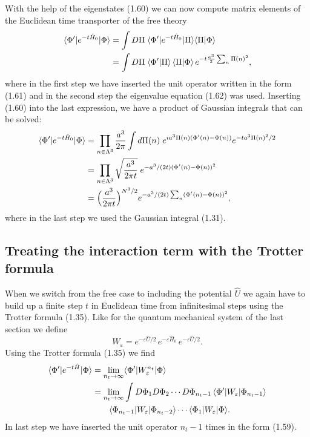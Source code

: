 With the help of the eigenstates (1.60) we can now compute matrix elements of
the Euclidean time transporter of the free theory
\begin{align}
  \langle\Phi'|e^{-t\hat{H}_0}|\Phi\rangle
  &= \int D\Pi\;\langle\Phi'|e^{-t\hat{H}_0}|\Pi\rangle\langle\Pi|\Phi\rangle \notag\\
  &= \int D\Pi\;\langle\Phi'|\Pi\rangle\,\langle\Pi|\Phi\rangle\,
     e^{-t\frac{a^3}{2}\sum_n \Pi(n)^2},
\end{align}
where in the first step we have inserted the unit operator written in the form
(1.61) and in the second step the eigenvalue equation (1.62) was used.
Inserting (1.60) into the last expression, we have a product of Gaussian
integrals that can be solved:
\begin{align}
  \langle\Phi'|e^{-t\hat{H}_0}|\Phi\rangle
  &= \prod_{n\in\Lambda^3}\frac{a^3}{2\pi}
     \int d\Pi(n)\;e^{i a^3\Pi(n)(\Phi'(n)-\Phi(n))}
     e^{-t a^3\Pi(n)^2/2} \notag\\
  &= \prod_{n\in\Lambda^3}\sqrt{\frac{a^3}{2\pi t}}\;
     e^{-a^3/(2t)(\Phi'(n)-\Phi(n))^2} \notag\\
  &= \Big(\frac{a^3}{2\pi t}\Big)^{N^3/2}
     e^{-a^3/(2t)\sum_n(\Phi'(n)-\Phi(n))^2},
\end{align}
where in the last step we used the Gaussian integral (1.31).

\subsection{Treating the interaction term with the Trotter formula}

When we switch from the free case to including the potential $\hat{U}$ we again
have to build up a finite step $t$ in Euclidean time from infinitesimal steps
using the Trotter formula (1.35). Like for the quantum mechanical system of the
last section we define
\begin{equation}
  W_\varepsilon = e^{-\varepsilon\hat{U}/2}\,e^{-\varepsilon\hat{H}_0}\,
  e^{-\varepsilon\hat{U}/2}.
\end{equation}
Using the Trotter formula (1.35) we find
\begin{align}
  \langle\Phi'|e^{-t\hat{H}}|\Phi\rangle
  &= \lim_{n_t\to\infty}\langle\Phi'|W_\varepsilon^{n_t}|\Phi\rangle \notag\\
  &= \lim_{n_t\to\infty}\int D\Phi_1 D\Phi_2\cdots D\Phi_{n_t-1}\,
     \langle\Phi'|W_\varepsilon|\Phi_{n_t-1}\rangle \notag\\
  &\qquad \langle\Phi_{n_t-1}|W_\varepsilon|\Phi_{n_t-2}\rangle\cdots
     \langle\Phi_1|W_\varepsilon|\Phi\rangle.
\end{align}
In last step we have inserted the unit operator $n_t - 1$ times in the form
(1.59).

